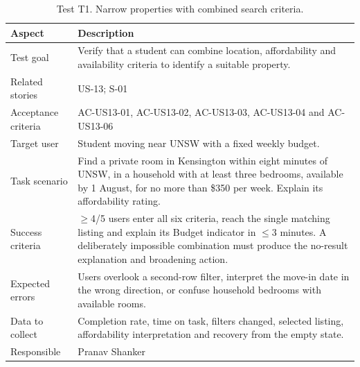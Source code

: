 \documentclass[11pt,a4paper]{article}
\begin{document}
\begin{table}[H]
    \centering
    \small
    \caption{Test T1. Narrow properties with combined search criteria.}
    \begin{tabularx}{\textwidth}{@{}L{3.4cm}Y@{}}
        \toprule
        Aspect & Description\\
        \midrule
        Test goal & Verify that a student can combine location, affordability and availability criteria to identify a suitable property.\\
        Related stories & US-13; S-01\\
        Acceptance criteria & AC-US13-01, AC-US13-02, AC-US13-03, AC-US13-04 and AC-US13-06\\
        Target user & Student moving near UNSW with a fixed weekly budget.\\
        Task scenario & Find a private room in Kensington within eight minutes of UNSW, in a household with at least three bedrooms, available by 1 August, for no more than \$350 per week. Explain its affordability rating.\\
        Success criteria & $\geq$4/5 users enter all six criteria, reach the single matching listing and explain its Budget indicator in $\leq$3 minutes. A deliberately impossible combination must produce the no-result explanation and broadening action.\\
        Expected errors & Users overlook a second-row filter, interpret the move-in date in the wrong direction, or confuse household bedrooms with available rooms.\\
        Data to collect & Completion rate, time on task, filters changed, selected listing, affordability interpretation and recovery from the empty state.\\
        Responsible & Pranav Shanker\\
        \bottomrule
    \end{tabularx}
    \label{tabtestt1}
\end{table}
\end{document}
